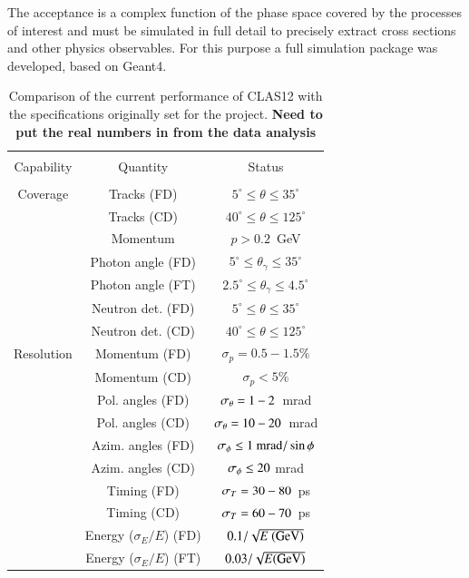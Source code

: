 \documentclass[final,3p,times,twocolumn,authoryear]{elsarticle}
\begin{document}
The acceptance is a complex function of the phase space covered by the processes of interest and must be simulated in 
full detail to precisely extract cross sections and other physics observables.  For this purpose a full simulation package was
developed, based on Geant4. 

\begin{table}[ht!]
\begin{center}
\caption{ Comparison of the current performance of CLAS12 with the specifications originally set for the project. 
  {\bf Need to put the real numbers in from the data analysis} }    
\vspace{0.2cm}\label{clas12-performance}
\footnotesize
\begin{tabular}{|c|c|c|}
\hline
&&\\
Capability &  Quantity & Status\\
&&\\
\hline
Coverage & Tracks (FD) & $5^\circ \le \theta \le 35^\circ $ \\
& Tracks (CD)& $40^\circ \le \theta \le 125^\circ$  \\
& Momentum & $p > 0.2$~GeV \\
& Photon angle (FD)& $5^\circ \le \theta_\gamma \le 35^\circ$ \\  
& Photon angle (FT)& $2.5^\circ \le \theta_\gamma \le 4.5^\circ$ \\  
& Neutron det. (FD) & $5^\circ \le \theta \le 35^\circ $ \\
& Neutron det. (CD) &  $ 40^\circ \le \theta \le 125^\circ$ \\
\hline
Resolution & Momentum (FD)& $\sigma_p =  0.5 - 1.5 \%$  \\
& Momentum (CD) & $\sigma_p  < 5\%$  \\
 & Pol. angles (FD) & $\sigma_\theta = \rm  1- 2$~mrad  \\
 & Pol. angles (CD) & $\sigma_\theta =  \rm 10- 20$~mrad \\
& Azim. angles (FD) & $\sigma_\phi  \le 1~{\rm mrad}/\sin\phi $ \\
& Azim. angles (CD) & $\sigma_\phi \le \rm 20$ mrad \\
 & Timing (FD) & $\sigma_T =\rm  30 - 80$~ps  \\
& Timing (CD) & $\sigma_T = \rm 60 - 70$~ps \\
& Energy ($\sigma_E / E$)  (FD) & $0.1 / \sqrt{E~({\rm GeV})}$ \\
& Energy ($\sigma_E / E$)  (FT) & $0.03 / \sqrt{E({\rm GeV})}$\\

\end{tabular}
\end{center}
\end{table}
\end{document}
